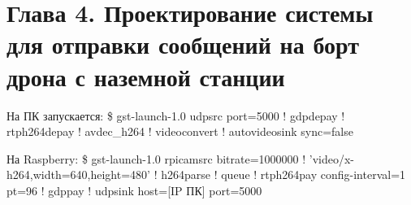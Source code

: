 
\section{Глава 4. Проектирование системы для отправки сообщений на борт дрона с наземной станции}
\begin{MyCode}
	На ПК запускается:
	\$ gst-launch-1.0 udpsrc port=5000 ! gdpdepay ! rtph264depay ! avdec_h264 ! videoconvert ! autovideosink sync=false
	
	На Raspberry:
	\$ gst-launch-1.0 rpicamsrc bitrate=1000000 ! 'video/x-h264,width=640,height=480' ! h264parse ! queue ! rtph264pay config-interval=1 pt=96 ! gdppay ! udpsink host=[IP ПК] port=5000
	
\end{MyCode}




